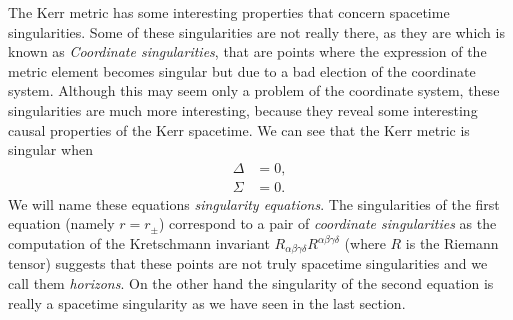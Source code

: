 The Kerr metric has some interesting properties that concern spacetime singularities. Some of these singularities are not really there, as they are which is known as \textit{Coordinate singularities}, that are points where the expression of the metric element becomes singular but due to a bad election of the coordinate system. Although this may seem only a problem of the coordinate system, these singularities are much more interesting, because they reveal some interesting causal properties of the Kerr spacetime. We can see that the Kerr metric is singular when
\begin{align}
 \Delta &=0,\\
 \Sigma&=0.
\end{align}
We will name these equations \textit{singularity equations}. The singularities of the first equation (namely $r=r_\pm$) correspond to a pair of \textit{coordinate singularities} as the computation of the Kretschmann invariant $R_{\alpha \beta \gamma \delta}R^{\alpha \beta \gamma \delta}$ (where $R$ is the Riemann tensor) suggests that these points are not truly spacetime singularities and we call them \textit{horizons}. On the other hand the singularity of the second equation is really a spacetime singularity as we have seen in the last section.

